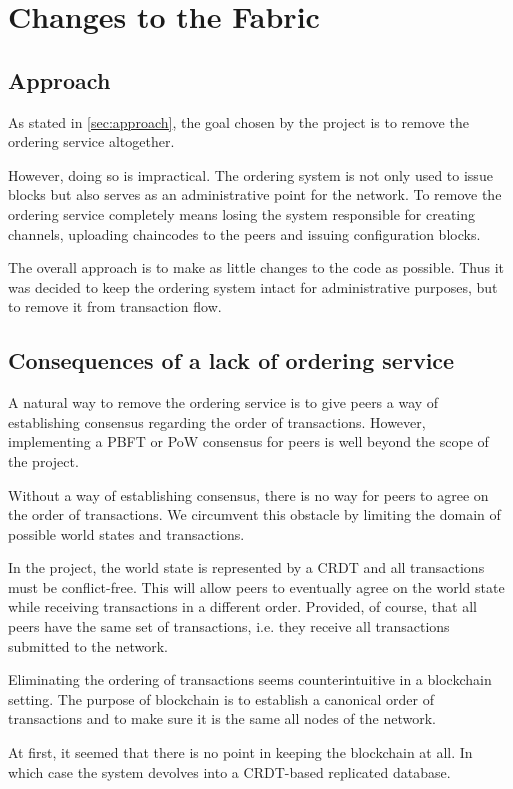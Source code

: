 \chapter{Changes to the Fabric}\label{chapter:fabric}
\section{Approach}
As stated in \ref{sec:approach}, the goal chosen by the project is to remove the ordering service altogether.

However, doing so is impractical. The ordering system is not only used to issue blocks but also serves as an administrative point for the network. To remove the ordering service completely means losing the system responsible for creating channels, uploading chaincodes to the peers and issuing configuration blocks.

The overall approach is to make as little changes to the code as possible.
Thus it was decided to keep the ordering system intact for administrative purposes, but to remove it from transaction flow.

\section{Consequences of a lack of ordering service}
\label{sec:app-noorder}

A natural way to remove the ordering service is to give peers a way of establishing consensus regarding the order of transactions. However, implementing a PBFT or PoW consensus for peers is well beyond the scope of the project.

Without a way of establishing consensus, there is no way for peers to agree on the order of transactions. We circumvent this obstacle by limiting the domain of possible world states and transactions.

In the project, the world state is represented by a CRDT and all transactions must be conflict-free. This will allow peers to eventually agree on the world state while receiving transactions in a different order. Provided, of course, that all peers have the same set of transactions, i.e. they receive all transactions submitted to the network.

Eliminating the ordering of transactions seems counterintuitive in a blockchain setting. The purpose of blockchain is to establish a canonical order of transactions and to make sure it is the same all nodes of the network.

At first, it seemed that there is no point in keeping the blockchain at all. In which case the system devolves into a CRDT-based replicated database.

